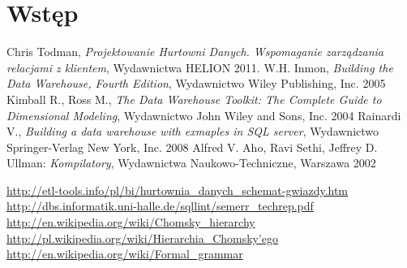 \documentclass[a4paper,12pt]{ report}
\newcommand*\stdchapter{}
\let\stdchapter\chapter
\renewcommand*\chapter{%
\clearpage\ifodd\value{page}\else\mbox{}\clearpage\fi
\stdchapter}
\begin{document}


\tableofcontents
\setlength{\parskip}{2ex plus 0.5ex minus 0.5ex}


\chapter*{Wstęp}








  


\renewcommand\lstlistlistingname{Listingi kodu}
\lstlistoflistings

\begin{thebibliography}{99}


Chris Todman, \textit{Projektowanie Hurtowni Danych. Wspomaganie zarządzania relacjami z klientem}, Wydawnictwa HELION 2011.
W.H. Inmon, \textit{Building the Data Warehouse, Fourth Edition}, Wydawnictwo Wiley Publishing, Inc. 2005
Kimball R., Ross M., \textit{ The Data Warehouse Toolkit: The Complete Guide to Dimensional Modeling}, Wydawnictwo John Wiley and Sons, Inc. 2004
 Rainardi V.,  \textit{Building a data warehouse with exmaples in SQL server}, Wydawnictwo  Springer-Verlag New York, Inc. 2008
  Alfred V. Aho, Ravi Sethi, Jeffrey D. Ullman: \textit{Kompilatory}, Wydawnictwa Naukowo-Techniczne, Warszawa 2002

   \url{http://etl-tools.info/pl/bi/hurtownia_danych_schemat-gwiazdy.htm}
   \url{http://dbs.informatik.uni-halle.de/sqllint/semerr_techrep.pdf}
   \url{http://en.wikipedia.org/wiki/Chomsky\_hierarchy}
   \url{http://pl.wikipedia.org/wiki/Hierarchia\_Chomsky'ego}
   \url{http://en.wikipedia.org/wiki/Formal_grammar}


\end{thebibliography}
\end{document}
